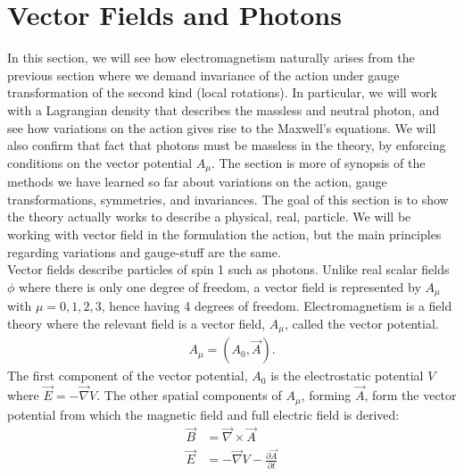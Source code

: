 \documentclass{book}
\numberwithin{equation}{section}
\theoremstyle{definition}
\begin{document}
\section{Vector Fields and Photons}
In this section, we will see how electromagnetism naturally arises from the previous section where we demand invariance of the action under gauge transformation of the second kind (local rotations). In particular, we will work with a Lagrangian density that describes the massless and neutral photon, and see how variations on the action gives rise to the Maxwell's equations. We will also confirm that fact that photons must be massless in the theory, by enforcing conditions on the vector potential $A_\mu$. The section is more of synopsis of the methods we have learned so far about variations on the action, gauge transformations, symmetries, and invariances. The goal of this section is to show the theory actually works to describe a physical, real, particle. We will be working with vector field in the formulation the action, but the main principles regarding variations and gauge-stuff are the same.  \\

Vector fields describe particles of spin 1 such as photons. Unlike real scalar fields $\phi$ where there is only one degree of freedom, a vector field is represented by $A_\mu$ with $\mu = 0,1,2,3$, hence having 4 degrees of freedom. Electromagnetism is a field theory where the relevant field is a vector field, $A_\mu$, called the vector potential.
\begin{align}
A_\mu = (A_0, \vec{A}).
\end{align}
The first component of the vector potential, $A_0$ is the electrostatic potential $V$ where $\vec{E} = -\vec{\nabla}V$. The other spatial components of $A_\mu$, forming $\vec{A}$, form the vector potential from which the magnetic field and full electric field is derived:
\begin{align}
\vec{B} &= \vec{\nabla}\times \vec{A}\\
\vec{E} &= -\vec{\nabla}V - \frac{\partial \vec{A}}{\partial t}
\end{align}
\end{document}
